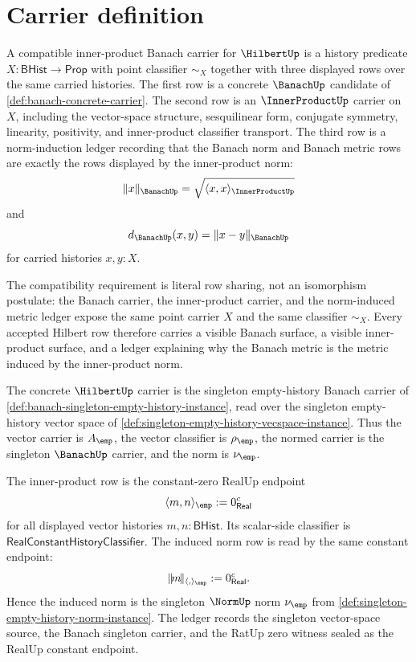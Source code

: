 \section{Carrier definition}
\label{sec:hilbert-carrier}

\begin{definition}
\label{def:hilbert-compatible-inner-product-banach-carrier}
A compatible inner-product Banach carrier for $\HilbertUp$ is a history
predicate $X:\mathsf{BHist}\to\mathsf{Prop}$ with point classifier
$\sim_X$ together with three displayed rows over the same carried histories.
The first row is a concrete $\BanachUp$ candidate of
\autoref{def:banach-concrete-carrier}. The second row is an
$\InnerProductUp$ carrier on $X$, including the vector-space structure,
sesquilinear form, conjugate symmetry, linearity, positivity, and
inner-product classifier transport. The third row is a norm-induction ledger
recording that the Banach norm and Banach metric rows are exactly the rows
displayed by the inner-product norm:
$$
\|x\|_{\BanachUp}=\sqrt{\langle x,x\rangle_{\InnerProductUp}}
$$
and
$$
d_{\BanachUp}(x,y)=\|x-y\|_{\BanachUp}
$$
for carried histories $x,y:X$.

The compatibility requirement is literal row sharing, not an isomorphism
postulate: the Banach carrier, the inner-product carrier, and the
norm-induced metric ledger expose the same point carrier $X$ and the same
classifier $\sim_X$. Every accepted Hilbert row therefore carries a visible
Banach surface, a visible inner-product surface, and a ledger explaining why
the Banach metric is the metric induced by the inner-product norm.
\end{definition}

\begin{definition}
\label{def:hilbert-singleton-empty-history-carrier}
The concrete $\HilbertUp$ carrier is the singleton empty-history Banach
carrier of \autoref{def:banach-singleton-empty-history-instance}, read over
the singleton empty-history vector space of
\autoref{def:singleton-empty-history-vecspace-instance}. Thus the vector
carrier is $A_{\emp}$, the vector classifier is $\rho_{\emp}$, the normed
carrier is the singleton $\BanachUp$ carrier, and the norm is
$\nu_{\emp}$.

The inner-product row is the constant-zero RealUp endpoint
$$
\langle m,n\rangle_{\emp}:=0_{\mathsf{Real}}^{c}
$$
for all displayed vector histories $m,n:\mathsf{BHist}$. Its scalar-side
classifier is $\mathsf{RealConstantHistoryClassifier}$. The induced norm row
is read by the same constant endpoint:
$$
\|\!m\!\|_{\langle,\rangle_{\emp}}:=0_{\mathsf{Real}}^{c}.
$$
Hence the induced norm is the singleton $\NormUp$ norm $\nu_{\emp}$ from
\autoref{def:singleton-empty-history-norm-instance}. The ledger records the
singleton vector-space source, the Banach singleton carrier, and the RatUp zero
witness sealed as the RealUp constant endpoint.
\end{definition}


